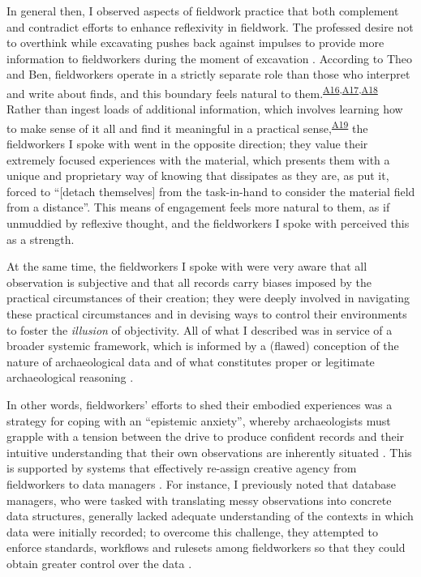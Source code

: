 \documentclass{article}
\begin{document}
In general then, I observed aspects of fieldwork practice that both
complement and contradict efforts to enhance reflexivity in fieldwork.
The professed desire not to overthink while excavating pushes back
against impulses to provide more information to fieldworkers during the
moment of excavation \parencites[cf.][]{berggren2012,berggren2015}.
According to Theo and Ben, fieldworkers operate in a strictly separate
role than those who interpret and write about finds, and this boundary
feels natural to
them.\textsuperscript{\hyperref[sec-A16]{A16},\hyperref[sec-A17]{A17},\hyperref[sec-A18]{A18}}
Rather than ingest loads of additional information, which involves
learning how to make sense of it all and find it meaningful in a
practical sense,\textsuperscript{\hyperref[sec-A19]{A19}} the
fieldworkers I spoke with went in the opposite direction; they value
their extremely focused experiences with the material, which presents
them with a unique and proprietary way of knowing that dissipates as
they are, as \textcite[109]{edgeworth2003} put it, forced to ``{[}detach
themselves{]} from the task-in-hand to consider the material field from
a distance''. This means of engagement feels more natural to them, as if
unmuddied by reflexive thought, and the fieldworkers I spoke with
perceived this as a strength.

At the same time, the fieldworkers I spoke with were very aware that all
observation is subjective and that all records carry biases imposed by
the practical circumstances of their creation; they were deeply involved
in navigating these practical circumstances and in devising ways to
control their environments to foster the \emph{illusion} of objectivity.
All of what I described was in service of a broader systemic framework,
which is informed by a (flawed) conception of the nature of
archaeological data and of what constitutes proper or legitimate
archaeological reasoning \parencite{batist-alienation}.

In other words, fieldworkers' efforts to shed their embodied experiences
was a strategy for coping with an ``epistemic anxiety'', whereby
archaeologists must grapple with a tension between the drive to produce
confident records and their intuitive understanding that their own
observations are inherently situated
\parencites[274-278]{huggett2022a}[55-57]{lucas2019}{wylie2017,batist2024a}.
This is supported by systems that effectively re-assign creative agency
from fieldworkers to data managers
\parencites{batist2024a}{batist-alienation}. For instance, I previously
noted that database managers, who were tasked with translating messy
observations into concrete data structures, generally lacked adequate
understanding of the contexts in which data were initially recorded; to
overcome this challenge, they attempted to enforce standards, workflows
and rulesets among fieldworkers so that they could obtain greater
control over the data \parencite{batist2024a}.
\end{document}
